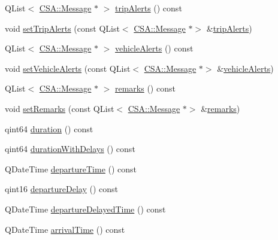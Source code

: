 \begin{DoxyCompactItemize}
\item 
Q\+List$<$ \mbox{\hyperlink{classCSA_1_1Message}{C\+S\+A\+::\+Message}} $\ast$ $>$ \mbox{\hyperlink{classCSA_1_1Route_a6e5c03d04237cea4167239b201f2d40b}{trip\+Alerts}} () const
\item 
void \mbox{\hyperlink{classCSA_1_1Route_a0ef9be4b744e679ab9daeb8e39753f8f}{set\+Trip\+Alerts}} (const Q\+List$<$ \mbox{\hyperlink{classCSA_1_1Message}{C\+S\+A\+::\+Message}} $\ast$$>$ \&\mbox{\hyperlink{classCSA_1_1Route_a6e5c03d04237cea4167239b201f2d40b}{trip\+Alerts}})
\item 
Q\+List$<$ \mbox{\hyperlink{classCSA_1_1Message}{C\+S\+A\+::\+Message}} $\ast$ $>$ \mbox{\hyperlink{classCSA_1_1Route_a173ce470308b9f20ae2273d987c6041f}{vehicle\+Alerts}} () const
\item 
void \mbox{\hyperlink{classCSA_1_1Route_af9373662a655881774662dd580926e50}{set\+Vehicle\+Alerts}} (const Q\+List$<$ \mbox{\hyperlink{classCSA_1_1Message}{C\+S\+A\+::\+Message}} $\ast$$>$ \&\mbox{\hyperlink{classCSA_1_1Route_a173ce470308b9f20ae2273d987c6041f}{vehicle\+Alerts}})
\item 
Q\+List$<$ \mbox{\hyperlink{classCSA_1_1Message}{C\+S\+A\+::\+Message}} $\ast$ $>$ \mbox{\hyperlink{classCSA_1_1Route_a6f5f7a812156030f15b7e94b2e43a72a}{remarks}} () const
\item 
void \mbox{\hyperlink{classCSA_1_1Route_a285384451bf966a13649e38762205026}{set\+Remarks}} (const Q\+List$<$ \mbox{\hyperlink{classCSA_1_1Message}{C\+S\+A\+::\+Message}} $\ast$$>$ \&\mbox{\hyperlink{classCSA_1_1Route_a6f5f7a812156030f15b7e94b2e43a72a}{remarks}})
\item 
qint64 \mbox{\hyperlink{classCSA_1_1Route_aa23f1a78718f02e17eb409909c6b01b4}{duration}} () const
\item 
qint64 \mbox{\hyperlink{classCSA_1_1Route_a8c89a2514e3f0d0f57ccae96291f33f2}{duration\+With\+Delays}} () const
\item 
Q\+Date\+Time \mbox{\hyperlink{classCSA_1_1Route_ac137b60b8eb1ca666d842d0c7a1e1f1e}{departure\+Time}} () const
\item 
qint16 \mbox{\hyperlink{classCSA_1_1Route_a8773b1afb576a67ba7a76e010aeca537}{departure\+Delay}} () const
\item 
Q\+Date\+Time \mbox{\hyperlink{classCSA_1_1Route_a24964759b1d391a4bb45c7e40daed095}{departure\+Delayed\+Time}} () const
\item 
Q\+Date\+Time \mbox{\hyperlink{classCSA_1_1Route_a29727ecadd5b223b2c34dfe79ae4219a}{arrival\+Time}} () const
\item 
$$
\end{DoxyCompactItemize}

